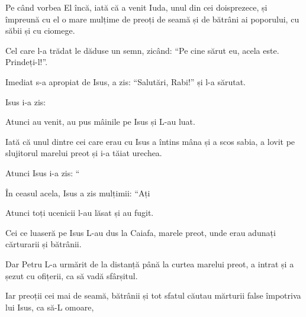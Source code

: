 {


\par }{\PP {}Pe când vorbea El încă, iată că a venit Iuda, unul din cei doisprezece, și împreună cu el o mare mulțime de preoți de seamă și de bătrâni ai poporului, cu săbii și cu ciomege.

Cel care l-a trădat le dăduse un semn, zicând: “Pe cine sărut eu, acela este. Prindeți-l!”.

Imediat s-a apropiat de Isus, a zis: “Salutări, Rabi!” și l-a sărutat.


\par }{\PP {}Isus i-a zis:
{}

\par }{\PP Atunci au venit, au pus mâinile pe Isus și L-au luat.

Iată că unul dintre cei care erau cu Isus a întins mâna și a scos sabia, a lovit pe slujitorul marelui preot și i-a tăiat urechea.


\par }{\PP {}Atunci Isus i-a zis: “{}




\par }{\PP {}În ceasul acela, Isus a zis mulțimii: “Ați
{}


\par }{\PP Atunci toți ucenicii l-au lăsat și au fugit.


\par }{\PP {}Cei ce luaseră pe Isus L-au dus la Caiafa, marele preot, unde erau adunați cărturarii și bătrânii.

Dar Petru L-a urmărit de la distanță până la curtea marelui preot, a intrat și a șezut cu ofițerii, ca să vadă sfârșitul.


\par }{\PP {}Iar preoții cei mai de seamă, bătrânii și tot sfatul căutau mărturii false împotriva lui Isus, ca să-L omoare,

}
